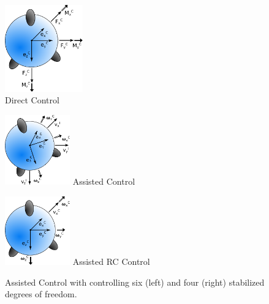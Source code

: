 \begin{figure}[H] %
	\begin{center}
		\includegraphics[width=0.3\textwidth]{DC.pdf}
		\caption[Direct control]{Direct Control}  
		\label{figure:direct_control}
	\end{center}
\end{figure}

\begin{figure}[H]		
	\small{
		\begin{center}
			\parbox{0.25\textwidth}{\includegraphics[width=0.25\textwidth]{AC}
			 Assisted Control}
			\hspace{0.1\textwidth}			
			\parbox{0.25\textwidth}{\includegraphics[width=0.25\textwidth]{RC}
			Assisted RC Control}
	\caption[Assisted Control]{Assisted Control with controlling six (left) and four (right) stabilized degrees of freedom.}
		\label{figure:assisted_control}
		\end{center}
	}			
	\vspace{4.5mm}
\end{figure}

